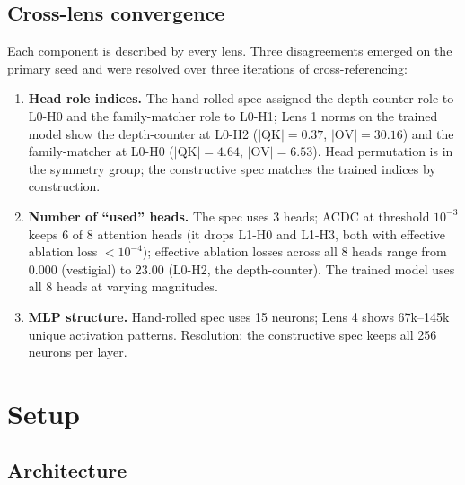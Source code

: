 \documentclass[11pt,letterpaper]{article}
\begin{document}
\subsection{Cross-lens convergence}

Each component is described by every lens. Three disagreements emerged on the primary seed and were resolved over three iterations of cross-referencing:
\begin{enumerate}[itemsep=2pt,topsep=2pt]
\item \textbf{Head role indices.} The hand-rolled spec assigned the depth-counter role to L0-H0 and the family-matcher role to L0-H1; Lens 1 norms on the trained model show the depth-counter at L0-H2 ($|\mathrm{QK}| = 0.37$, $|\mathrm{OV}| = 30.16$) and the family-matcher at L0-H0 ($|\mathrm{QK}| = 4.64$, $|\mathrm{OV}| = 6.53$). Head permutation is in the symmetry group; the constructive spec matches the trained indices by construction.
\item \textbf{Number of ``used'' heads.} The spec uses 3 heads; ACDC at threshold $10^{-3}$ keeps 6 of 8 attention heads (it drops L1-H0 and L1-H3, both with effective ablation loss $< 10^{-4}$); effective ablation losses across all 8 heads range from 0.000 (vestigial) to 23.00 (L0-H2, the depth-counter). The trained model uses all 8 heads at varying magnitudes.
\item \textbf{MLP structure.} Hand-rolled spec uses 15 neurons; Lens 4 shows 67k--145k unique activation patterns. Resolution: the constructive spec keeps all 256 neurons per layer.
\end{enumerate}

\section{Setup}
\label{sec:setup}

\subsection{Architecture}
\end{document}
